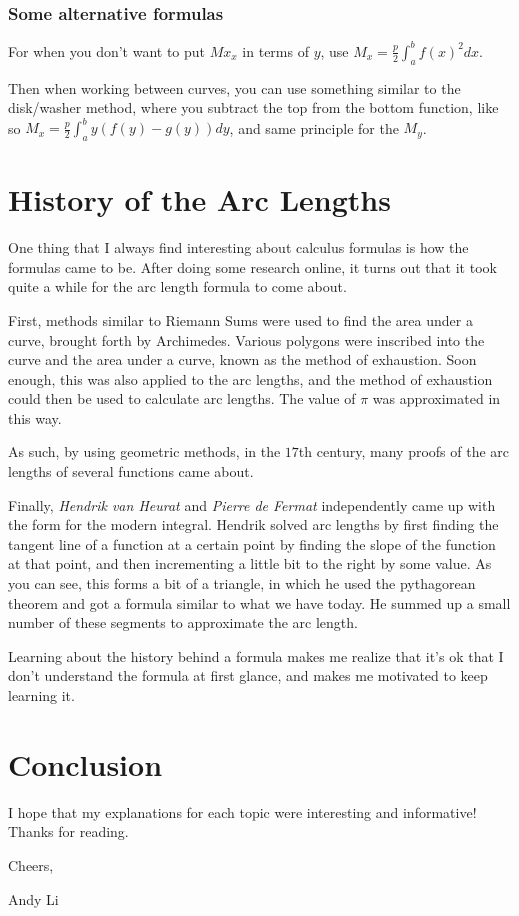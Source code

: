 \documentclass[letterpaper, 12pt]{article}
\begin{document}
\subsubsection{Some alternative formulas}
For when you don't want to put $Mx_{x}$ in terms of $y$, use $M_{x}=\frac{p}{2}\int_{a}^{b}f\left(x\right)^{2}dx$. \par
Then when working between curves, you can use something similar to the disk/washer method, where you subtract the top from the bottom function, like so $M_{x}=\frac{p}{2}\int_{a}^{b}y\left(f\left(y\right)-g\left(y\right)\right)dy$, and same principle for the $M_{y}$.
\section{History of the Arc Lengths}
One thing that I always find interesting about calculus formulas is how the formulas came to be. After doing some research online, it turns out that it took quite a while for the arc length formula to come about. \par
First, methods similar to Riemann Sums were used to find the area under a curve, brought forth by Archimedes. Various polygons were inscribed into the curve and the area under a curve, known as the method of exhaustion. Soon enough, this was also applied to the arc lengths, and the method of exhaustion could then be used to calculate arc lengths. The value of $\pi$ was approximated in this way.\par
As such, by using geometric methods, in the $17$th century, many proofs of the arc lengths of several functions came about. \par
Finally, \textit{Hendrik van Heurat} and \textit{Pierre de Fermat} independently came up with the form for the modern integral. Hendrik solved arc lengths by first finding the tangent line of a function at a certain point by finding the slope of the function at that point, and then incrementing a little bit to the right by some value. As you can see, this forms a bit of a triangle, in which he used the pythagorean theorem and got a formula similar to what we have today. He summed up a small number of these segments to approximate the arc length. \par
Learning about the history behind a formula makes me realize that it's ok that I don't understand the formula at first glance, and makes me motivated to keep learning it. 
\section{Conclusion}
I hope that my explanations for each topic were interesting and informative! Thanks for reading. \bigskip \par
Cheers, \par
Andy Li
\end{document}
